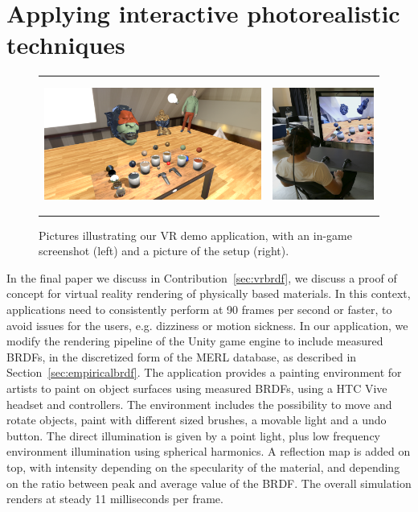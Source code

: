 \section{Applying interactive photorealistic techniques}
\label{sec:vrbrfcontribution}
\begin{figure}[t]
\centering
\begin{tabular}{@{}c@{}c@{}}
	 \includegraphics[height = 4.3cm]{figures/screen1_crop} &
		 \includegraphics[height = 4.3cm]{figures/person} \\[-2.5ex]
\end{tabular}
  \caption{Pictures illustrating our VR demo application, with an in-game screenshot (left) and a picture of the setup (right). }
  \label{fig:vrbrdfimage}
\end{figure}
In the final paper we discuss in Contribution~\ref{sec:vrbrdf}, we discuss a proof of concept for virtual reality rendering of physically based materials. In this context, applications need to consistently perform at 90 frames per second or faster, to avoid issues for the users, e.g. dizziness or motion sickness. In our application, we modify the rendering pipeline of the Unity game engine to include measured BRDFs, in the discretized form of the MERL database, as described in Section~\ref{sec:empiricalbrdf}. The application provides a painting environment for artists to paint on object surfaces using measured BRDFs, using a HTC Vive headset and controllers. The environment includes the possibility to move and rotate objects, paint with different sized brushes, a movable light and a undo button. The direct illumination is given by a point light, plus low frequency environment illumination using spherical harmonics. A reflection map is added on top, with intensity depending on the specularity of the material, and depending on the ratio between peak and average value of the BRDF. The overall simulation renders at steady 11 milliseconds per frame.


